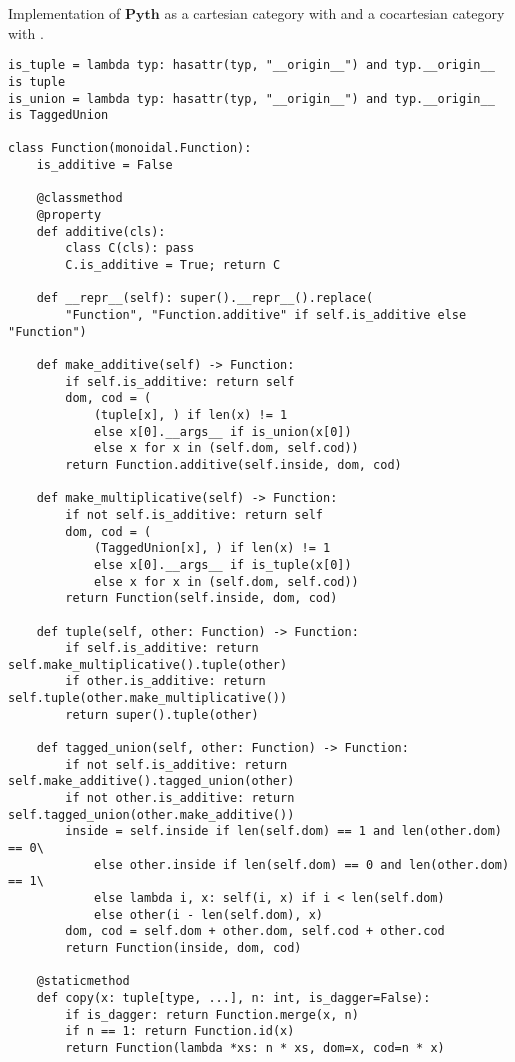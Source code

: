 \begin{python}\label{listing:python-co-cartesian}
{\normalfont Implementation of $\mathbf{Pyth}$ as a cartesian category with  and a cocartesian category with .}

\begin{verbatim}
is_tuple = lambda typ: hasattr(typ, "__origin__") and typ.__origin__ is tuple
is_union = lambda typ: hasattr(typ, "__origin__") and typ.__origin__ is TaggedUnion

class Function(monoidal.Function):
    is_additive = False

    @classmethod
    @property
    def additive(cls):
        class C(cls): pass
        C.is_additive = True; return C

    def __repr__(self): super().__repr__().replace(
        "Function", "Function.additive" if self.is_additive else "Function")

    def make_additive(self) -> Function:
        if self.is_additive: return self
        dom, cod = (
            (tuple[x], ) if len(x) != 1
            else x[0].__args__ if is_union(x[0])
            else x for x in (self.dom, self.cod))
        return Function.additive(self.inside, dom, cod)

    def make_multiplicative(self) -> Function:
        if not self.is_additive: return self
        dom, cod = (
            (TaggedUnion[x], ) if len(x) != 1
            else x[0].__args__ if is_tuple(x[0])
            else x for x in (self.dom, self.cod))
        return Function(self.inside, dom, cod)

    def tuple(self, other: Function) -> Function:
        if self.is_additive: return self.make_multiplicative().tuple(other)
        if other.is_additive: return self.tuple(other.make_multiplicative())
        return super().tuple(other)

    def tagged_union(self, other: Function) -> Function:
        if not self.is_additive: return self.make_additive().tagged_union(other)
        if not other.is_additive: return self.tagged_union(other.make_additive())
        inside = self.inside if len(self.dom) == 1 and len(other.dom) == 0\
            else other.inside if len(self.dom) == 0 and len(other.dom) == 1\
            else lambda i, x: self(i, x) if i < len(self.dom)
            else other(i - len(self.dom), x)
        dom, cod = self.dom + other.dom, self.cod + other.cod
        return Function(inside, dom, cod)

    @staticmethod
    def copy(x: tuple[type, ...], n: int, is_dagger=False):
        if is_dagger: return Function.merge(x, n)
        if n == 1: return Function.id(x)
        return Function(lambda *xs: n * xs, dom=x, cod=n * x)


\end{verbatim}
\end{python}

